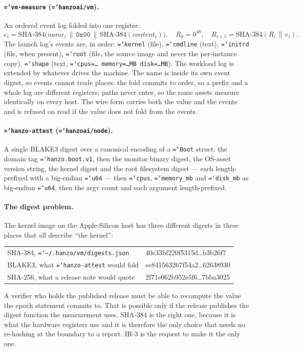 \documentclass[11pt,a4paper]{article}
\newcommand{\code}[1]{\texttt{\hyphenchar\font=`\-\relax #1}}
\newcommand{\sha}[1]{\mathrm{SHA\text{-}#1}}
\begin{document}
\paragraph{\code{vm-measure} (\code{hanzoai/vm}).} An ordered event log folded into
one register:
\[
e_i = \sha{384}\bigl(\mathit{name}_i \,\|\, \mathtt{0x00} \,\|\, \sha{384}(\mathit{content}_i)\bigr),
\quad R_0 = 0^{48}, \quad R_{i+1} = \sha{384}(R_i \,\|\, e_i).
\]
The launch log's events are, in order: \code{kernel} (file), \code{cmdline} (text),
\code{initrd} (file, when present), \code{root} (file, the source image and never
the per-instance copy), \code{shape} (text,
\code{cpus=\dots\ memory=\dots MB disk=\dots MB}). The workload log is extended by
whatever drives the machine. The name is inside its own event digest, so events
cannot trade places; the fold commits to order, so a prefix and a whole log are
different registers; paths never enter, so the same assets measure identically on
every host. The wire form carries both the value and the events and is refused on
read if the value does not fold from the events.

\paragraph{\code{hanzo-attest} (\code{hanzoai/node}).} A single BLAKE3 digest over a
canonical encoding of a \code{Boot} struct: the domain tag \code{hanzo.boot.v1},
then the monitor binary digest, the OS-asset version string, the kernel digest and
the root filesystem digest --- each length-prefixed with a big-endian \code{u64} ---
then \code{cpus}, \code{memory\_mb} and \code{disk\_mb} as big-endian \code{u64},
then the argv count and each argument length-prefixed.

\paragraph{The digest problem.} The kernel image on the Apple-Silicon host has three
different digests in three places that all describe ``the kernel'':

\begin{center}\footnotesize\ttfamily
\begin{tabular}{@{}ll@{}}
\toprule
SHA-384, \code{\textasciitilde/.hanzo/vm/digests.json} & 40c33bf220f5315d\dots{}b3b26f7 \\
BLAKE3, what \code{hanzo-attest} would fold & ee841563267f54a2\dots{}62638930 \\
SHA-256, what a release note would quote & 2f71e062b952e5f6\dots{}7bba3025 \\
\bottomrule
\end{tabular}
\end{center}

\noindent
A verifier who holds the published release must be able to recompute the value the
epoch statement commits to. That is possible only if the release publishes the
digest function the measurement uses. SHA-384 is the right one, because it is what
the hardware registers use and it is therefore the only choice that needs no
re-hashing at the boundary to a report. IR-3 is the request to make it the only one.
\end{document}
